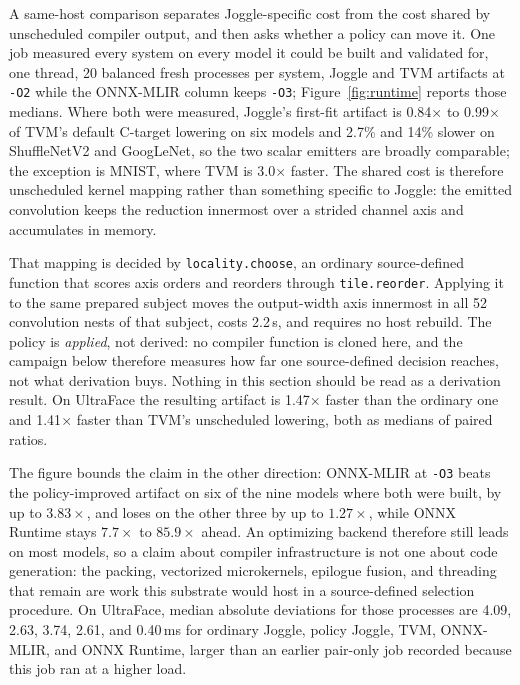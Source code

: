 \documentclass[sigplan,anonymous,review]{acmart}
\begin{document}
A same-host comparison separates Joggle-specific cost from the cost shared by
unscheduled compiler output, and then asks whether a policy can move it. One job
measured every system on every model it could be built and validated for, one
thread, 20 balanced fresh processes per system, Joggle and TVM artifacts at
\texttt{-O2} while the ONNX-MLIR column keeps \texttt{-O3};
Figure~\ref{fig:runtime} reports those medians. Where both were measured, Joggle's first-fit artifact is 0.84$\times$ to
0.99$\times$ of TVM's default C-target lowering on six models and 2.7\% and
14\% slower on ShuffleNetV2 and GoogLeNet, so the two scalar emitters are
broadly comparable; the exception is MNIST, where TVM is 3.0$\times$ faster.
The shared cost is therefore unscheduled kernel mapping rather than something
specific to Joggle: the emitted convolution keeps the reduction innermost over a
strided channel axis and accumulates in memory.

That mapping is decided by \texttt{locality.choose}, an ordinary source-defined
function that scores axis orders and reorders through \texttt{tile.reorder}.
Applying it to the same prepared subject moves the output-width axis innermost
in all 52 convolution nests of that subject, costs 2.2\,s, and requires no host
rebuild. The policy is \emph{applied}, not derived: no compiler function
is cloned here, and the campaign below therefore measures how far one
source-defined decision reaches, not what derivation buys. Nothing in this
section should be read as a derivation result. On UltraFace
the resulting artifact is 1.47$\times$ faster than the ordinary one and
1.41$\times$ faster than TVM's unscheduled lowering, both as medians of paired
ratios.

The figure bounds the claim in the other direction: ONNX-MLIR at \texttt{-O3}
beats the policy-improved artifact on six of the nine models where both were
built, by up to $3.83\times$, and loses on the other three by up to
$1.27\times$, while ONNX Runtime stays $7.7\times$ to $85.9\times$ ahead. An
optimizing backend therefore still leads on most models, so a claim about
compiler infrastructure is not one about code generation: the packing,
vectorized microkernels, epilogue fusion, and threading that remain are work this
substrate would host in a source-defined selection procedure. On UltraFace, median absolute deviations for those processes are 4.09, 2.63,
3.74, 2.61, and 0.40\,ms for ordinary Joggle, policy Joggle, TVM, ONNX-MLIR, and
ONNX Runtime, larger than an earlier pair-only job recorded because this job ran
at a higher load.
\end{document}
